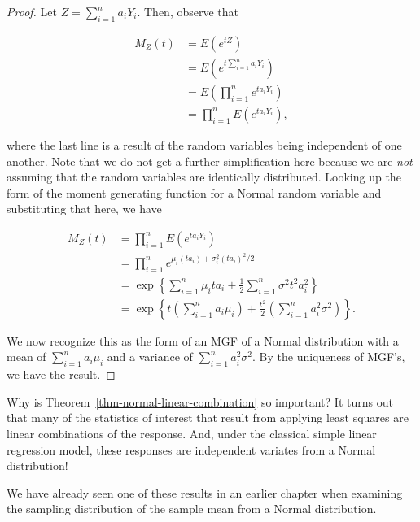 \documentclass[
  letterpaper,
  DIV=11,
  numbers=noendperiod]{scrreprt}
\theoremstyle{plain}
\theoremstyle{definition}
\theoremstyle{definition}
\theoremstyle{remark}
\begin{document}
\begin{proof}

Let \(Z = \sum_{i=1}^{n} a_i Y_i\). Then, observe that

\[
\begin{aligned}
  M_Z(t) 
    &= E\left(e^{tZ}\right) \\
    &= E\left(e^{t \sum_{i=1}^{n} a_i Y_i}\right) \\
    &= E\left(\prod_{i=1}^{n} e^{ta_i Y_i}\right) \\
    &= \prod_{i=1}^{n} E\left(e^{t a_i Y_i}\right),
\end{aligned}
\]

where the last line is a result of the random variables being
independent of one another. Note that we do not get a further
simplification here because we are \emph{not} assuming that the random
variables are identically distributed. Looking up the form of the moment
generating function for a Normal random variable and substituting that
here, we have

\[
\begin{aligned}
  M_Z(t) 
    &= \prod_{i=1}^{n} E\left(e^{t a_i Y_i}\right) \\
    &= \prod_{i=1}^{n} e^{\mu_i \left(t a_i\right) + \sigma_i^2 \left(t a_i\right)^2 / 2} \\
    &= \exp\left\{\sum_{i=1}^{n} \mu_i t a_i + \frac{1}{2} \sum_{i=1}^{n} \sigma^2 t^2 a_i^2\right\} \\
    &= \exp\left\{t \left(\sum_{i=1}^{n} a_i \mu_i\right) + \frac{t^2}{2} \left(\sum_{i=1}^{n} a_i^2 \sigma^2\right)\right\}.
\end{aligned}
\]

We now recognize this as the form of an MGF of a Normal distribution
with a mean of \(\sum_{i=1}^{n} a_i \mu_i\) and a variance of
\(\sum_{i=1}^{n} a_i^2 \sigma^2\). By the uniqueness of MGF's, we have
the result.

\end{proof}

Why is Theorem~\ref{thm-normal-linear-combination} so important? It
turns out that many of the statistics of interest that result from
applying least squares are linear combinations of the response. And,
under the classical simple linear regression model, these responses are
independent variates from a Normal distribution!

We have already seen one of these results in an earlier chapter when
examining the sampling distribution of the sample mean from a Normal
distribution.
\end{document}

